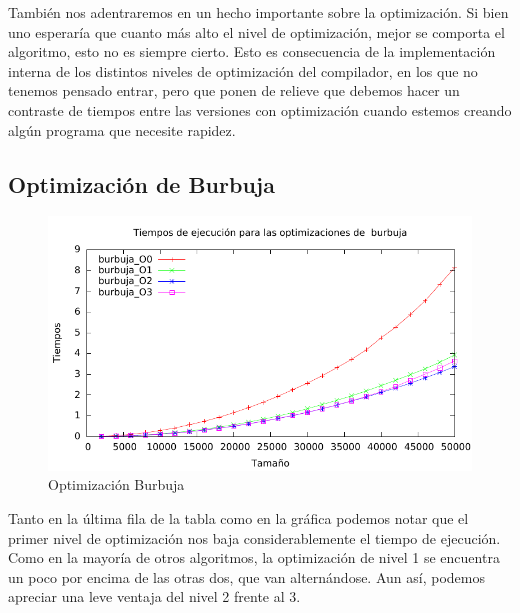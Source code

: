 \documentclass[a4paper, 11pt]{article}
\begin{document}
También nos adentraremos en un hecho importante sobre la optimización. Si bien uno esperaría que cuanto más alto el nivel de optimización, mejor se comporta el algoritmo, esto no es siempre cierto. Esto es consecuencia de la implementación interna de los distintos niveles de optimización del compilador, en los que no tenemos pensado entrar, pero que ponen de relieve que debemos hacer un contraste de tiempos entre las versiones con optimización cuando estemos creando algún programa que necesite rapidez.

\newpage
\subsection{Optimización de Burbuja}

\begin{figure}[H]\includegraphics[width=13cm]{img/burbuja_optim_g.pdf} \centering
	\caption{Optimización Burbuja}\end{figure}

Tanto en la última fila de la tabla como en la gráfica podemos notar que el primer nivel de optimización nos baja considerablemente el tiempo de ejecución. Como en la mayoría de otros algoritmos, la optimización de nivel 1 se encuentra un poco por encima de las otras dos, que van alternándose. Aun así, podemos apreciar una leve ventaja del nivel 2 frente al 3.

\newpage
\end{document}
